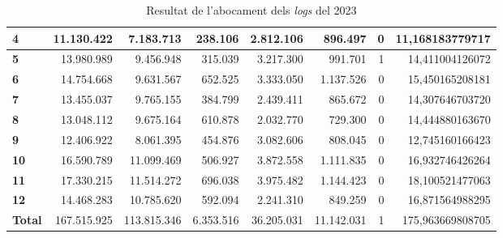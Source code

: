 \begin{table}[h!]
\begin{adjustbox}{width=1.5\textwidth, center}
\begin{tabular}{|l|r|r|r|r|r|r|r|}
            \textbf{4}     & 11.130.422  & 7.183.713   & 238.106   & 2.812.106  & 896.497    & 0 & 11,168183779717  \\
            \midrule
            \textbf{5}     & 13.980.989  & 9.456.948   & 315.039   & 3.217.300  & 991.701    & 1 & 14,411004126072  \\
            \textbf{6}     & 14.754.668  & 9.631.567   & 652.525   & 3.333.050  & 1.137.526  & 0 & 15,450165208181  \\
            \textbf{7}     & 13.455.037  & 9.765.155   & 384.799   & 2.439.411  & 865.672    & 0 & 14,307646703720  \\
            \textbf{8}     & 13.048.112  & 9.675.164   & 610.878   & 2.032.770  & 729.300    & 0 & 14,444880163670  \\
            \midrule
            \textbf{9}     & 12.406.922  & 8.061.395   & 454.876   & 3.082.606  & 808.045    & 0 & 12,745160166423  \\
            \textbf{10}    & 16.590.789  & 11.099.469  & 506.927   & 3.872.558  & 1.111.835  & 0 & 16,932746426264  \\
            \textbf{11}    & 17.330.215  & 11.514.272  & 696.038   & 3.975.482  & 1.144.423  & 0 & 18,100521477063  \\
            \textbf{12}    & 14.468.283  & 10.785.620  & 592.094   & 2.241.310  & 849.259    & 0 & 16,871564988295  \\
            \midrule
            \textbf{Total} & 167.515.925 & 113.815.346 & 6.353.516 & 36.205.031 & 11.142.031 & 1 & 175,963669808705 \\
            \bottomrule
        \end{tabular}
    \end{adjustbox}
    \caption{Resultat de l'abocament dels \textit{logs} del 2023}
    \label{tab:logs-table-2023}
\end{table}
